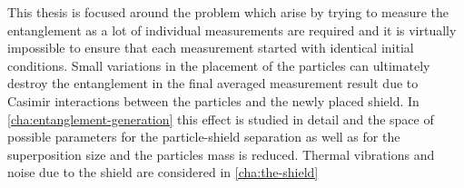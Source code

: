 This thesis is focused around the problem which arise by trying to measure the entanglement as a lot of individual measurements are required and it is virtually impossible to ensure that each measurement started with identical initial conditions.
Small variations in the placement of the particles can ultimately destroy the entanglement in the final averaged measurement result due to Casimir interactions between the particles and the newly placed shield. 
In \cref{cha:entanglement-generation} this effect is studied in detail and the space of possible parameters for the particle-shield separation as well as for the superposition size and the particles mass is reduced.
Thermal vibrations and noise due to the shield are considered in \cref{cha:the-shield}
